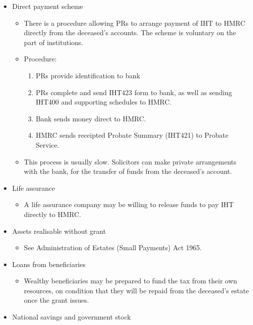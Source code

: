 \documentclass[
]{article}
\providecommand{\tightlist}{%
  \setlength{\itemsep}{0pt}\setlength{\parskip}{0pt}}
\begin{document}
\begin{itemize}
\tightlist
\item
  Direct payment scheme

  \begin{itemize}
  \tightlist
  \item
    There is a procedure allowing PRs to arrange payment of IHT to HMRC
    directly from the deceased's accounts. The scheme is voluntary on
    the part of institutions.
  \item
    Procedure:

    \begin{enumerate}
    \def\labelenumi{\arabic{enumi}.}
    \tightlist
    \item
      PRs provide identification to bank
    \item
      PRs complete and send IHT423 form to bank, as well as sending
      IHT400 and supporting schedules to HMRC.
    \item
      Bank sends money direct to HMRC.
    \item
      HMRC sends receipted Probate Summary (IHT421) to Probate Service.
    \end{enumerate}
  \item
    This process is usually slow. Solicitors can make private
    arrangements with the bank, for the transfer of funds from the
    deceased's account.
  \end{itemize}
\item
  Life assurance

  \begin{itemize}
  \tightlist
  \item
    A life assurance company may be willing to release funds to pay IHT
    directly to HMRC.
  \end{itemize}
\item
  Assets realisable without grant

  \begin{itemize}
  \tightlist
  \item
    See Administration of Estates (Small Payments) Act 1965.
  \end{itemize}
\item
  Loans from beneficiaries

  \begin{itemize}
  \tightlist
  \item
    Wealthy beneficiaries may be prepared to fund the tax from their own
    resources, on condition that they will be repaid from the deceased's
    estate once the grant issues.
  \end{itemize}
\item
  National savings and government stock


\end{itemize}
\end{document}
